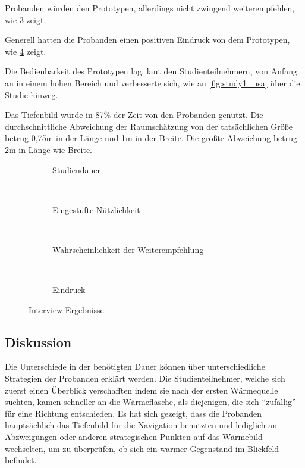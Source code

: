 Probanden würden den Prototypen, allerdings nicht zwingend weiterempfehlen, wie \cref{fig:study1_recom} zeigt.

Generell hatten die Probanden einen positiven Eindruck von dem Prototypen, wie \cref{fig:study1_impres} zeigt.

Die Bedienbarkeit des Prototypen lag, laut den Studienteilnehmern, von Anfang an in einem hohen Bereich und verbesserte sich, wie an \cref{fig:study1_usa} über die Studie hinweg.

Das Tiefenbild wurde in 87\% der Zeit von den Probanden genutzt.
Die durchschnittliche Abweichung der Raumschätzung von der tatsächlichen Größe betrug 0,75m in der Länge und 1m in der Breite.
Die größte Abweichung betrug 2m in Länge wie Breite.

\begin{figure}[H]
	\centering
	\begin{subfigure}[t]{0.45\textwidth}
		\centering
		\caption{Studiendauer}
		\label{fig:study1_duration}
	\end{subfigure}
	~
	\begin{subfigure}[t]{0.45\textwidth}
		\centering
		\caption{Eingestufte Nützlichkeit}
		\label{fig:study1_use}
	\end{subfigure}
	~
	\begin{subfigure}[t]{0.45\textwidth}
		\centering
		\caption{Wahrscheinlichkeit der Weiterempfehlung}
		\label{fig:study1_recom}
	\end{subfigure}
	~
	\begin{subfigure}[t]{0.45\textwidth}
		\centering
		\caption{Eindruck}
		\label{fig:study1_impres}
	\end{subfigure}
	\caption{Interview-Ergebnisse}
	\label{fig:study1_results1}
\end{figure}

\subsection{Diskussion}
Die Unterschiede in der benötigten Dauer können über unterschiedliche Strategien der Probanden erklärt werden.
Die Studienteilnehmer, welche sich zuerst einen Überblick verschafften indem sie nach der ersten Wärmequelle suchten, kamen schneller an die Wärmeflasche, als diejenigen, die sich \enquote{zufällig} für eine Richtung entschieden.
Es hat sich gezeigt, dass die Probanden hauptsächlich das Tiefenbild für die Navigation benutzten und lediglich an Abzweigungen oder anderen strategischen Punkten auf das Wärmebild wechselten, um zu überprüfen, ob sich ein warmer Gegenstand im Blickfeld befindet.

